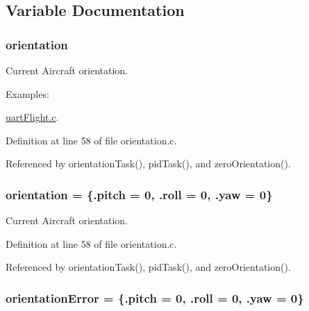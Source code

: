 \subsection{Variable Documentation}
\hypertarget{group__orientation_gacd4a2942520b68691db5aebde4e537a4}{
\subsubsection[{orientation}]{ orientation}}\label{group__orientation_gacd4a2942520b68691db5aebde4e537a4}


Current Aircraft orientation. 

\begin{Desc}
\item[Examples\-: ]\par
\hyperlink{uart_flight_8c-example}{uart\-Flight.\-c}.\end{Desc}


Definition at line 58 of file orientation.\-c.



Referenced by orientation\-Task(), pid\-Task(), and zero\-Orientation().

\hypertarget{group__orientation_gacd4a2942520b68691db5aebde4e537a4}{
\subsubsection[{orientation}]{ orientation = \{.pitch = 0, .roll = 0, .yaw = 0\}}}\label{group__orientation_gacd4a2942520b68691db5aebde4e537a4}


Current Aircraft orientation. 



Definition at line 58 of file orientation.\-c.



Referenced by orientation\-Task(), pid\-Task(), and zero\-Orientation().

\hypertarget{group__orientation_gab42c272957b0a5cdc11845ade183c2f9}{
\subsubsection[{orientation\-Error}]{ orientation\-Error = \{.pitch = 0, .roll = 0, .yaw = 0\}}}\label{group__orientation_gab42c272957b0a5cdc11845ade183c2f9}


